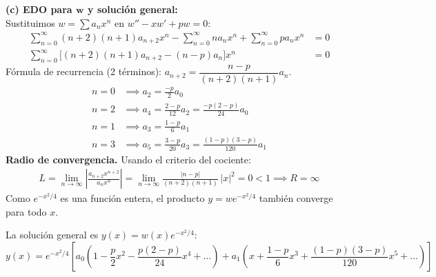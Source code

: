 \documentclass[11pt, a4paper]{article}
\begin{document}
\vspace{0.2cm}\noindent\textbf{(c) EDO para $\bm{w}$ y solución general:} \\
Sustituimos $w = \sum a_n x^n$ en $w'' - xw' + pw = 0$:
\begin{align*}
\sum_{n=0}^{\infty} (n+2)(n+1)a_{n+2} x^n - \sum_{n=0}^{\infty} n a_n x^n + \sum_{n=0}^{\infty} p a_n x^n &= 0 \\
\sum_{n=0}^{\infty} \big[ (n+2)(n+1)a_{n+2} - (n-p)a_n \big] x^n &= 0
\end{align*}
Fórmula de recurrencia (2 términos): $a_{n+2} = \dfrac{n-p}{(n+2)(n+1)} a_n$.
\begin{align*}
n=0 &\implies a_2 = \frac{-p}{2}a_0 \\
n=2 &\implies a_4 = \frac{2-p}{12}a_2 = \frac{-p(2-p)}{24}a_0 \\
n=1 &\implies a_3 = \frac{1-p}{6}a_1 \\
n=3 &\implies a_5 = \frac{3-p}{20}a_3 = \frac{(1-p)(3-p)}{120}a_1
\end{align*}
\textbf{Radio de convergencia.} Usando el criterio del cociente:
\begin{align*}
L = \lim_{n\to\infty}\left|\frac{a_{n+2}x^{n+2}}{a_nx^n}\right| = \lim_{n\to\infty}\frac{|n-p|}{(n+2)(n+1)}\,|x|^2 = 0 < 1 \implies R=\infty
\end{align*}
Como $e^{-x^2/4}$ es una función entera, el producto $y=we^{-x^2/4}$ también converge para todo $x$.

La solución general es $y(x) = w(x)e^{-x^2/4}$:
\[
\boxed{y(x) = e^{-x^2/4} \left[ a_0\left(1 - \frac{p}{2}x^2 - \frac{p(2-p)}{24}x^4 + \dots\right) + a_1\left(x + \frac{1-p}{6}x^3 + \frac{(1-p)(3-p)}{120}x^5 + \dots\right) \right]}
\]
\end{document}
